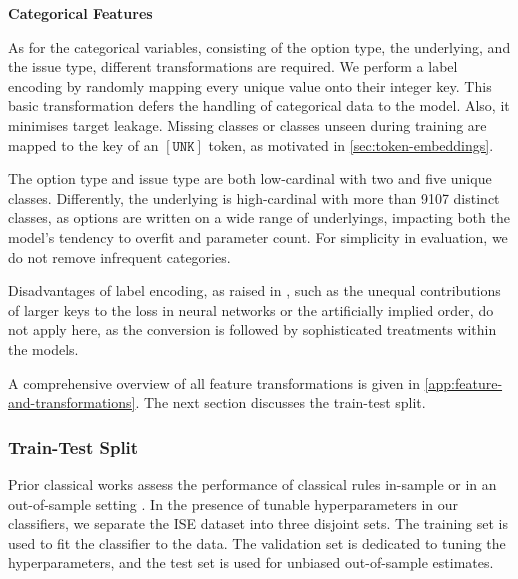 \textbf{Categorical Features}

As for the categorical variables, consisting of the option type, the underlying, and the issue type, different transformations are required. We perform a label encoding by randomly mapping every unique value onto their integer key. This basic transformation defers the handling of categorical data to the model. Also, it minimises target leakage. Missing classes or classes unseen during training are mapped to the key of an $\mathtt{[UNK]}$ \gls{token}, as motivated in \cref{sec:token-embeddings}.

The option type and issue type are both low-cardinal with two and five unique classes. Differently, the underlying is high-cardinal with more than \num{9107} distinct classes, as options are written on a wide range of underlyings, impacting both the model's tendency to overfit and parameter count. For simplicity in evaluation, we do not remove infrequent categories.

Disadvantages of label encoding, as raised in \textcite[][12]{hancockSurveyCategoricalData2020}, such as the unequal contributions of larger keys to the loss in neural networks or the artificially implied order, do not apply here, as the conversion is followed by sophisticated treatments within the models.

A comprehensive overview of all feature transformations is given in \cref{app:feature-and-transformations}. The next section discusses the train-test split.

\subsubsection{Train-Test Split}\label{sec:train-test-split}

Prior classical works assess the performance of classical rules in-sample \autocite[cp.][541]{ellisAccuracyTradeClassification2000} or in an out-of-sample setting \autocites[cp.][7--9]{grauerOptionTradeClassification2022}[][3814--3815]{chakrabartyTradeClassificationAlgorithms2007}. In the presence of tunable hyperparameters in our classifiers, we separate the \gls{ISE} dataset into three disjoint sets. The training set is used to fit the classifier to the data. The validation set is dedicated to tuning the hyperparameters, and the test set is used for unbiased out-of-sample estimates.

